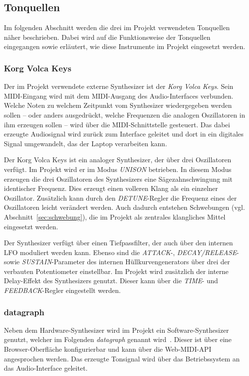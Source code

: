 \documentclass[11pt]{article}
\begin{document}
\subsection{Tonquellen}

Im folgenden Abschnitt werden die drei im Projekt verwendeten Tonquellen näher beschrieben. Dabei wird auf die Funktionsweise der Tonquellen eingegangen sowie erläutert, wie diese Instrumente im Projekt eingesetzt werden.

\subsubsection{Korg Volca Keys}
Der im Projekt verwendete externe Synthesizer ist der \textit{Korg Volca Keys}. Sein MIDI-Eingang wird mit dem MIDI-Ausgang des Audio-Interfaces verbunden. Welche Noten zu welchem Zeitpunkt vom Synthesizer wiedergegeben werden sollen -- oder anders ausgedrückt, welche Frequenzen die analogen Oszillatoren in ihm erzeugen sollen -- wird über die MIDI-Schnittstelle gesteuert. Das dabei erzeugte Audiosignal wird zurück zum Interface geleitet und dort in ein digitales Signal umgewandelt, das der Laptop verarbeiten kann.

Der Korg Volca Keys ist ein analoger Synthesizer, der über drei Oszillatoren verfügt. Im Projekt wird er im Modus \textit{UNISON} betrieben. In diesem Modus erzeugen die drei Oszillatoren des Synthesizers eine Sägezahnschwingung mit identischer Frequenz. Dies erzeugt einen volleren Klang als ein einzelner Oszillator. Zusätzlich kann durch den \textit{DETUNE}-Regler die Frequenz eines der Oszillatoren leicht verändert werden. Auch dadurch entstehen Schwebungen (vgl. Abschnitt~\ref{sec:schwebung}), die im Projekt als zentrales klangliches Mittel eingesetzt werden.

Der Synthesizer verfügt über einen Tiefpassfilter, der auch über den internen LFO moduliert werden kann. Ebenso sind die \textit{ATTACK}-, \textit{DECAY/RELEASE}- sowie \textit{SUSTAIN}-Parameter des internen Hüllkurvengenerators über drei der verbauten Potentiometer einstellbar. Im Projekt wird zusätzlich der interne Delay-Effekt des Synthesizers genutzt. Dieser kann über die \textit{TIME}- und \textit{FEEDBACK}-Regler eingestellt werden.

\subsubsection{datagraph}
\label{sec:softwaresynth}

Neben dem Hardware-Synthesizer wird im Projekt ein Software-Synthesizer genutzt, welcher im Folgenden \textit{datagraph} genannt wird~\cite{SimmelbauerDatagraph}. Dieser ist über eine Browser-Oberfläche konfigurierbar und kann über die Web-MIDI-API~\cite{Wilson:25:WMA} angesprochen werden. Das erzeugte Tonsignal wird über das Betriebssystem an das Audio-Interface geleitet.
\end{document}
